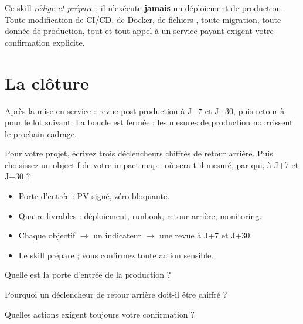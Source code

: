 \begin{piege}
Ce skill \emph{rédige et prépare} ; il n'exécute \textbf{jamais} un déploiement de production. Toute modification de CI/CD, de Docker, de
fichiers , toute migration, toute donnée de production, tout  et tout appel à un service payant exigent votre
confirmation explicite.
\end{piege}

\section{La clôture}
Après la mise en service : revue post-production à J+7 et J+30, puis retour à  pour le lot suivant. La boucle est
fermée : les mesures de production nourrissent le prochain cadrage.

\begin{vousjouez}
Pour votre projet, écrivez trois déclencheurs chiffrés de retour arrière. Puis choisissez un objectif de votre impact map : où
sera-t-il mesuré, par qui, à J+7 et J+30 ?
\end{vousjouez}

\begin{retenir}[À retenir]
\begin{itemize}
  \item Porte d'entrée : PV signé, zéro bloquante.
  \item Quatre livrables : déploiement, runbook, retour arrière, monitoring.
  \item Chaque objectif $\to$ un indicateur $\to$ une revue à J+7 et J+30.
  \item Le skill prépare ; vous confirmez toute action sensible.
\end{itemize}
\end{retenir}

\begin{acquis}
  \item Quelle est la porte d'entrée de la production ?
  \item Pourquoi un déclencheur de retour arrière doit-il être chiffré ?
  \item Quelles actions exigent toujours votre confirmation ?
\end{acquis}
